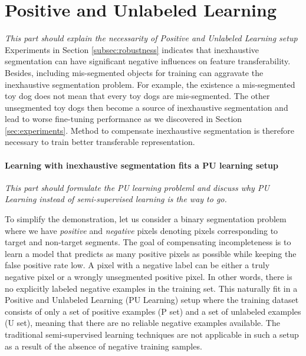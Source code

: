 \section{Positive and Unlabeled Learning}
\label{sec:pulearning}

\noindent \textit{This part should explain the necessarity of Positive and Unlabeled Learning setup}
\noindent
Experiments in Section \ref{subsec:robustness} indicates that inexhaustive segmentation can have significant negative influences on feature transferability.
Besides, including mis-segmented objects for training can aggravate the inexhaustive segmentation problem.
For example, the existence a mis-segmented toy dog does not mean that every toy dogs are mis-segmented.
The other unsegmented toy dogs then become a source of inexhaustive segmentation and lead to worse fine-tuning performance as we discovered in Section \ref{sec:experiments}.
Method to compensate inexhaustive segmentation is therefore necessary to train better transferable representation.

\paragraph{Learning with inexhaustive segmentation fits a PU learning setup}
\noindent \textit{This part should formulate the PU learning probleml and discuss why PU Learning instead of semi-supervised learning is the way to go.}

\noindent
To simplify the demonstration, let us consider a binary segmentation problem where we have \textit{positive} and \textit{negative} pixels denoting pixels corresponding to target and non-target segments.
The goal of compensating incompleteness is to learn a model that predicts as many positive pixels as possible while keeping the false positive rate low.
A pixel with a negative label can be either a truly negative pixel or a wrongly unsegmented positive pixel.
In other words, there is no explicitly labeled negative examples in the training set.
This naturally fit in a Positive and Unlabeled Learning (PU Learning) setup where the training dataset consists of only a set of positive examples (P set) and a set of unlabeled examples (U set), meaning that there are no reliable negative examples available.
The traditional semi-supervised learning techniques are not applicable in such a setup as a result of the absence of negative training samples.

